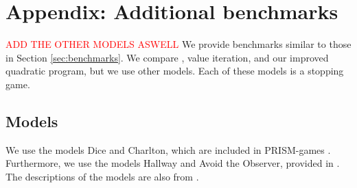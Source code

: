 \chapter{Appendix: Additional benchmarks} \label{sec:appendix}
\textcolor{red}{ADD THE OTHER MODELS ASWELL}
We provide benchmarks similar to those in Section \ref{sec:benchmarks}. We compare \conQP{}, value iteration, and our improved quadratic program, but we use other models. Each of these models is a stopping game.
\section*{Models}
We use the models Dice \cite{dice} and Charlton\cite{charlton}, which are included in PRISM-games \cite{PRISM-games}. Furthermore, we use the models Hallway and Avoid the Observer, provided in \cite{cav20}. The descriptions of the models are also from \cite{cav20}.
